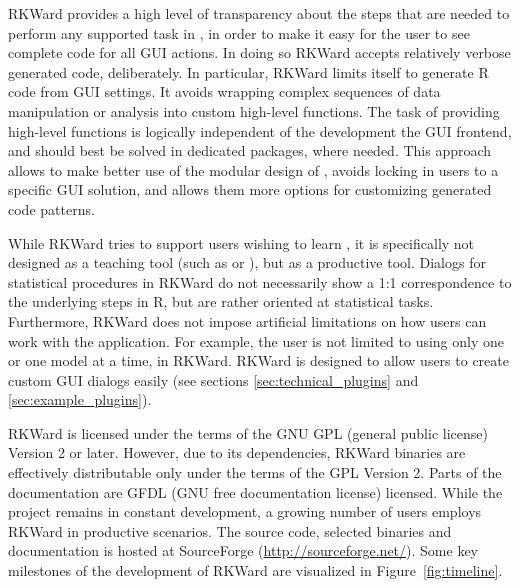 RKWard provides a high level of transparency about the steps that are needed to
perform any supported task in , in order to make it easy for the user to see
complete code for all GUI actions. In doing so RKWard accepts relatively verbose
generated code, deliberately. In particular, RKWard limits itself to generate R
code from GUI settings. It avoids wrapping complex sequences of data
manipulation or analysis into custom high-level  functions. The task of
providing high-level functions is logically independent of the development the
GUI frontend, and should best be solved in dedicated  packages, where needed.
This approach allows to make better use of the modular design of , avoids
locking in users to a specific GUI solution, and allows them more options for
customizing generated code patterns.

While RKWard tries to support users wishing to learn , it is specifically not
designed as a teaching tool (such as  or ), but as
a productive tool. Dialogs for statistical procedures in RKWard do not
necessarily show a 1:1 correspondence to the underlying steps in R, but are
rather oriented at statistical tasks. Furthermore, RKWard does not impose
artificial limitations on how users can work with the application. For example,
the user is not limited to using only one  or one model at a
time, in RKWard. RKWard is designed to allow users to create custom GUI dialogs
easily (see sections \ref{sec:technical_plugins} and \ref{sec:example_plugins}).

RKWard is licensed under the terms of the GNU GPL (general public license) Version 2
or later. However, due to its dependencies, RKWard binaries are effectively
distributable only under the terms of the GPL Version 2. Parts of the documentation are
GFDL (GNU free documentation license) licensed. While the project remains in constant development, a growing
number of users employs RKWard in productive scenarios. The source code,
selected binaries and documentation is hosted at SourceForge
(\url{http://sourceforge.net/}). Some key milestones of the development of RKWard are
visualized in Figure~\ref{fig:timeline}.

